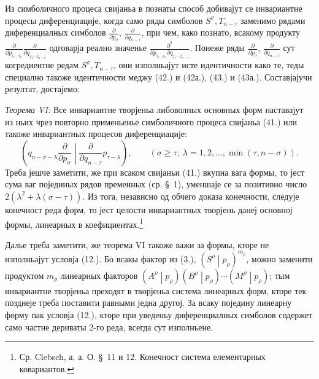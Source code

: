 \documentclass[11pt]{article}
\newcommand{\pair}[2]{\left(#1\middle|#2\right)}
\begin{document}
Из симболичного процеса свијаньа в познаты способ добивајут се инвариантне процесы диференциације, когда само ряды симболов $S^\sigma,T_{n-\tau}$ заменимо рядами диференциалных симболов $\frac{\partial}{\partial p_\sigma}$, $\frac{\partial}{\partial q_{n-\tau}}$, при чем, како познато, всакому продукту $\frac{\partial}{\partial p_{i_1\ldots i_\sigma}}\frac{\partial}{\partial q_{j_1\ldots j_{n-\tau}}}$ одговарја реално значенье $\frac{\partial^2}{\partial p_{i_1\ldots i_\sigma}\partial q_{j_1\ldots j_{n-\tau}}}$. Понеже ряды $\frac{\partial}{\partial p_\sigma}$, $\frac{\partial}{\partial q_{n-\tau}}$ сут когредиентне редам $S^\sigma,T_{n-\tau}$, они изполньајут исте идентичности како те, теды специално такоже идентичности меджу (42.) и (42а.), (43.) и (43а.). Составјајучи резултат, достајемо:

\emph{Теорема VI:} Все инвариантне творјеньа либоволных основных форм наставајут из ньих чрез повторно применьенье симболичного процеса свијаньа (41.) или такоже инвариантных процесов диференциације:
\begin{equation}
 \left(q_{n-\sigma-\lambda}\frac{\partial}{\partial p_\sigma}
 \middle|\frac{\partial}{\partial q_{n-\tau}}p_{\tau-\lambda}\right),
 \qquad(\sigma\ge\tau,\ \lambda=1,2,\ldots,\min(\tau,n-\sigma)).
\tag{45}
\end{equation}
Треба јешче заметити, же при всаком свијаньи (41.) вкупна вага формы, то јест сума ваг појединых рядов пременных (ср. \S\ 1), уменшаје се за позитивно число $2(\lambda^2+\lambda(\sigma-\tau))$. Из тога, независно од обчего доказа конечности, следује конечност реда форм, то јест целости инвариантных творјень данеј основној формы, линеарных в коефициентах.\footnote{Ср. Clebsch, а. а. О. \S\ 11 и 12. Конечност система елементарных ковариантов.}

Далье треба заметити, же теорема VI такоже важи за формы, кторе не изполньајут условја (12.). Бо всакы фактор из (3.), $\pair{S^\rho}{p_\rho}^{m_\rho}$, можно заменити продуктом $m_\rho$ линеарных факторов $\pair{A^\rho}{p_\rho}\pair{B^\rho}{p_\rho}\cdots\pair{M^\rho}{p_\rho}$; тым инвариантне творјеньа преходят в творјеньа система линеарных форм, кторе тек позднеје треба поставити равными једна другој. За всаку поједину линеарну форму пак условја (12.), кторе при уведеньу диференциалных симболов содержет само частне дериваты 2-го реда, всегда сут изполньене.
\end{document}
